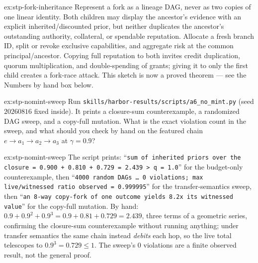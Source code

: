 \documentclass[11pt,a4paper]{article}
\theoremstyle{definition}
\begin{document}
\begin{pdsolution}{ex:stp-fork-inheritance}
Represent a fork as a lineage DAG, never as two copies of one linear identity.
Both children may display the ancestor's evidence with an explicit
inherited/discounted prior, but neither duplicates the ancestor's outstanding
authority, collateral, or spendable reputation. Allocate a fresh branch ID,
split or revoke exclusive capabilities, and aggregate risk at the common
principal/ancestor. Copying full reputation to both invites credit
duplication, quorum multiplication, and double-spending of grants; giving it
to only the first child creates a fork-race attack. This sketch is now a
proved theorem --- see the Numbers by hand box below.
\end{pdsolution}

\begin{pdexercise}[kind=Trace,rating=2]{ex:stp-nomint-sweep}
Run \texttt{skills/harbor-results/scripts/a6\_no\_mint.py} (seed $20260816$
fixed inside). It prints a closure-sum counterexample, a randomized DAG sweep,
and a copy-full mutation. What is the exact violation count in the sweep, and
what should you check by hand on the featured chain $e\to a_1\to a_2\to a_3$
at $\gamma=0.9$?
\end{pdexercise}
\begin{pdsolution}{ex:stp-nomint-sweep}
The script prints: ``\texttt{sum of inherited priors over the closure = 0.900
+ 0.810 + 0.729 = 2.439 > q = 1.0}'' for the budget-only counterexample, then
``\texttt{4000 random DAGs \dots{} 0 violations; max live/witnessed ratio
observed = 0.999995}'' for the transfer-semantics sweep, then ``\texttt{an
8-way copy-fork of one outcome yields 8.2x its witnessed value}'' for the
copy-full mutation. By hand: $0.9+0.9^2+0.9^3=0.9+0.81+0.729=2.439$, three
terms of a geometric series, confirming the closure-sum counterexample without
running anything; under transfer semantics the same chain instead \emph{debits}
each hop, so the live total telescopes to $0.9^3=0.729\le 1$.
The sweep's $0$ violations are a finite observed result, not the general proof.
\end{pdsolution}

\end{document}
